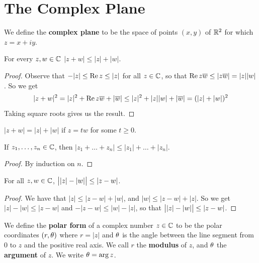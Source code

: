 \section{The Complex Plane}

\begin{definition}
    We define the \textbf{complex plane} to be the space of points $(x,y)$ of
    $\mathbb{R}^2$ for which  $z=x+iy$.
\end{definition}

\begin{lemma}\label{1.2.1}
    For every $z,w \in \mathbb{C}$  $|z+w| \leq |z|+|w|$.
\end{lemma}
\begin{proof}
    Observe that $-|z| \leq \operatorname{Re}{z} \leq |z|$ for all $z \in \mathbb{C}$, so that
    $\operatorname{Re}{z\overline{w}} \leq |z\overline{w}|=|z||w|$. So we get
    \begin{equation*}
        |z+w|^2=|z|^2+\operatorname{Re}{z\overline{w}}+|\overline{w}| \leq
        |z|^2+|z||w|+|\overline{w}|=(|z|+|w|)^2
    \end{equation*}
    Taking square roots gives us the result.
\end{proof}
\begin{corollary}
    $|z+w|=|z|+|w|$ if  $z=tw$ for some  $t \geq 0$.
\end{corollary}
\begin{corollary}
    If $z_1, \dots, z_n \in \mathbb{C}$, then $|z_1+\dots+z_n| \leq
    |z_1|+\dots+|z_n|$.
\end{corollary}
\begin{proof}
    By induction on $n$.
\end{proof}
\begin{corollary}
    For all $z,w \in \mathbb{C}$,  $\big{|}|z|-|w|\big{|} \leq |z-w|$.
\end{corollary}
\begin{proof}
    We have that $|z| \leq |z-w|+|w|$, and $|w| \leq |z-w|+|z|$. So
    we get $|z|-|w| \leq |z-w|$ and $-|z-w| \leq |w|-|z|$, so that
    $\big{|}|z|-|w|\big{|} \leq |z-w|$.
\end{proof}

\begin{definition}
    We define the \textbf{polar form} of a complex number $z \in \mathbb{C}$ to be the
    polar coordinates  $(r,\theta)$ where $r=|z|$ and  $\theta$ is the angle between
    the line segment from  $0$ to  $z$ and the positive real axis. We call  $r$
    the \textbf{modulus} of $z$, and  $\theta$ the  \textbf{argument} of $z$. We
    write $\theta=\arg{z}$.
\end{definition}

